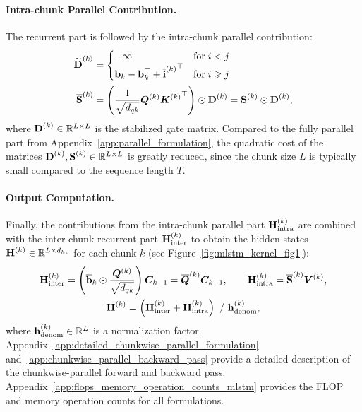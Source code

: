\documentclass{article}
\newcommand{\Hinter}{\bm{\rH}_{\text{inter}}}
\newcommand{\Hintra}{\bm{\rH}_{\text{intra}}}
\begin{document}
\paragraph{Intra-chunk Parallel Contribution.}
The recurrent part is followed by the intra-chunk parallel contribution:
\vspace{-0.2cm}
\begin{align}
    \widetilde{\bm{\rD}}^{(k)} & = \begin{cases}
                                       - \infty                                                        & \text{for} \; i < j    \\ %
                                       \bm{\Rb}_k - \bm{\Rb}_k^\top + {\overline{\bm{\Ri}}^{(k)}}^\top & \text{for} \; i \geq j %
                                   \end{cases} \\
    \overline{\bm{\rS}}^{(k)}  & = \left(\frac{1}{\sqrt{d_{qk}}} {\BQ^{(k)}} {\BK^{(k)}}^\top\right) \odot \bm{\rD}^{(k)} = \bm{\rS}^{(k)} \odot \bm{\rD}^{(k)},
\end{align}
where $\bm{\mathrm{D}}^{(k)} \in \mathbb{R}^{L \times L}$ is the stabilized gate matrix.
Compared to the fully parallel part from Appendix~\ref{app:parallel_formulation},
the quadratic cost of the matrices $\bm{\mathrm{D}}^{(k)}, \bm{\mathrm{S}}^{(k)} \in \mathbb{R}^{L \times L}$ is greatly reduced, since the chunk size $L$ is typically small compared to the sequence length $T$.
\vspace{-0.25cm}
\paragraph{Output Computation.}
Finally, the contributions from the intra-chunk parallel part $\Hintra^{(k)}$ are combined with the inter-chunk recurrent part $\Hinter^{(k)}$ to obtain the hidden states $\bm{\mathrm{H}}^{(k)} \in \mathbb{R}^{L \times d_{hv}}$ for each chunk $k$ (see Figure~\ref{fig:mlstm_kernel_fig1}):
\vspace{-0.2cm}
\begin{gather}
    \Hinter^{(k)}  = \left( \overline{\bm{\Rb}}_k \odot \frac{\BQ^{(k)}}{\sqrt{d_{qk}}} \right) \BC_{k-1} = \overline{\BQ}^{(k)} \BC_{k-1}, \quad \quad
    \Hintra^{(k)}  = \overline{\bm{\rS}}^{(k)} \BV^{(k)}, \\                                                                                  
    \bm{\rH}^{(k)} = \left( \Hinter^{(k)} + \Hintra^{(k)} \right) \ / \ {\bm{\Rh}^{(k)}_{\text{denom}}},
\end{gather}
where $\bm{\mathrm{h}}^{(k)}_{\text{denom}} \in \mathbb{R}^L$ is a normalization factor.
Appendix~\ref{app:detailed_chunkwise_parallel_formulation} and~\ref{app:chunkwise_parallel_backward_pass} provide a detailed description of the chunkwise-parallel forward and backward pass. Appendix~\ref{app:flops_memory_operation_counts_mlstm} provides the FLOP and memory operation counts for all formulations.
\vspace{-0.1cm}
\end{document}
